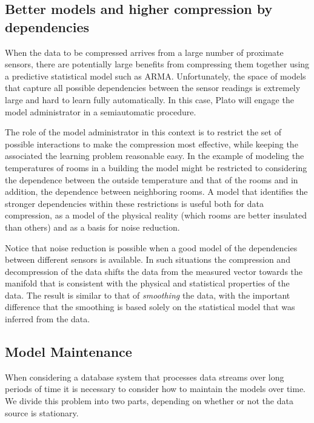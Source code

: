 \subsection{Better models and higher compression by dependencies}
\label{sec:dependencies}

When the data to be compressed arrives from a large number of
proximate sensors, there are potentially large benefits from
compressing them together using a predictive statistical model such as
ARMA. Unfortunately, the space of models that capture all possible dependencies
between the sensor readings is extremely large and hard to learn fully automatically.
In this case, Plato will engage the model administrator in a semiautomatic procedure.

The role of the model administrator in this context is to restrict the set
of possible interactions to make the compression most effective,
while keeping the associated the learning problem reasonable easy. In the
example of modeling the temperatures of rooms in a building the model
might be restricted to considering the dependence between the outside
temperature and that of the rooms and in addition, the dependence
between neighboring rooms. A model that identifies the stronger
dependencies within these restrictions is useful both for data
compression, as a model of the physical reality (which rooms are
better insulated than others) and as a basis for noise reduction.

Notice that noise reduction is
possible when a good model of the dependencies between different
sensors is available. In such situations the compression and
decompression of the data shifts the data from the measured vector
towards the manifold that is consistent with the physical and
statistical properties of the data. The result is similar to that of
{\em smoothing} the data, with the important difference that the
smoothing is based solely on the statistical model that was inferred from the data.



\subsection{Model Maintenance}
\label{sec:ivm}

When considering a database system that processes data streams over
long periods of time it is necessary to consider how to maintain the
models over time. We divide this problem into two parts, depending on
whether or not the data source is stationary.

